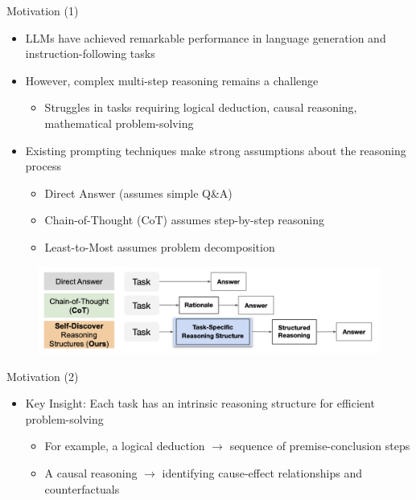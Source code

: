 \documentclass[aspectratio=169]{beamer}
\begin{document}
\begin{frame}{Motivation (1)}
\begin{itemize}
    \item LLMs have achieved remarkable performance in language generation and instruction-following tasks
    \pause
    \item However, complex multi-step reasoning remains a challenge
    \pause
    \begin{itemize}
    \item Struggles in tasks requiring logical deduction, causal reasoning, mathematical problem-solving
    \pause
    \end{itemize}
    \item Existing prompting techniques make strong assumptions about the reasoning process
    \pause
    \begin{itemize}
    \item Direct Answer (assumes simple Q\&A) \pause
    \item Chain-of-Thought (CoT) assumes step-by-step reasoning \pause
    \item Least-to-Most assumes problem decomposition \pause
    \end{itemize}
\end{itemize}
\begin{figure}
    \centering
    \includegraphics[width=0.7\linewidth]{prompt_types.png} 
\end{figure}
\end{frame}

\begin{frame}{Motivation (2)}
\begin{itemize}
    \item Key Insight: Each task has an intrinsic reasoning structure for efficient problem-solving \pause
    \begin{itemize}
        \item For example, a logical deduction $\longrightarrow$ sequence of premise-conclusion steps \pause
        \item A causal reasoning $\longrightarrow$ identifying cause-effect relationships and counterfactuals \pause
\end{itemize}
\end{itemize}
\end{frame}
\end{document}
